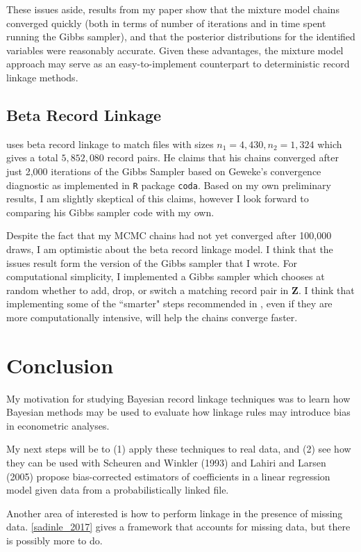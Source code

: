 \documentclass[11pt,reqno]{amsart}
\begin{document}
These issues aside, results from my paper show that the mixture model chains converged quickly (both in terms of number of iterations and in time spent running the Gibbs sampler), and that the posterior distributions for the identified variables were reasonably accurate.  Given these advantages, the mixture model approach may serve as an easy-to-implement counterpart to deterministic record linkage methods.

\subsection{Beta Record Linkage}
 \cite{sadinle_2017} uses beta record linkage to match files with sizes $n_1 = 4,430, n_2 = 1,324$ which gives a total $5,852,080$ record pairs.  He claims that his chains converged after just 2,000 iterations of the Gibbs Sampler based on Geweke's convergence diagnostic as implemented in \texttt{R} package \texttt{coda}.  Based on my own preliminary results, I am slightly skeptical of this claims, however I look forward to comparing his Gibbs sampler code with my own. 

Despite the fact that my MCMC chains had not yet converged after 100,000 draws, I am optimistic about the beta record linkage model.  I think that the issues result form the version of the Gibbs sampler that I wrote.  For computational simplicity, I implemented a Gibbs sampler which chooses at random whether to add, drop, or switch a matching record pair in $\mathbf{Z}$.   I think that implementing some of the ``smarter" steps recommended in \cite{larsen_2005}, even if they are more computationally intensive, will help the chains converge faster.
  
\section{Conclusion}

My motivation for studying Bayesian record linkage techniques was to learn how Bayesian methods may be used to evaluate how linkage rules may introduce bias in  econometric analyses.  

My next steps will be to (1) apply these techniques to real data, and (2) see how they can be used with Scheuren and Winkler (1993) and Lahiri and Larsen (2005) propose bias-corrected estimators of coefficients in a linear regression model given data from a probabilistically linked file. 

Another area of interested is how to perform linkage in the presence of missing data.  \ref{sadinle_2017} gives a framework that accounts for missing data, but there is possibly more to do. 
\end{document}
